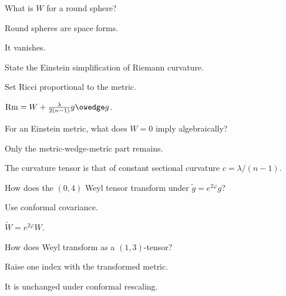 \begin{exercise}\label{exr:vii28-12}
What is \(W\) for a round sphere?
\end{exercise}
\begin{hint}
Round spheres are space forms.
\end{hint}
\begin{solution}
It vanishes.
\end{solution}

\begin{exercise}\label{exr:vii28-13}
State the Einstein simplification of Riemann curvature.
\end{exercise}
\begin{hint}
Set Ricci proportional to the metric.
\end{hint}
\begin{solution}
\(\operatorname{Rm}=W+\frac{\lambda}{2(n-1)}g\owedge g\).
\end{solution}

\begin{exercise}\label{exr:vii28-14}
For an Einstein metric, what does \(W=0\) imply algebraically?
\end{exercise}
\begin{hint}
Only the metric-wedge-metric part remains.
\end{hint}
\begin{solution}
The curvature tensor is that of constant sectional curvature \(c=\lambda/(n-1)\).
\end{solution}

\begin{exercise}\label{exr:vii28-15}
How does the \((0,4)\) Weyl tensor transform under \(\widetilde g=e^{2\varphi}g\)?
\end{exercise}
\begin{hint}
Use conformal covariance.
\end{hint}
\begin{solution}
\(\widetilde W=e^{2\varphi}W\).
\end{solution}

\begin{exercise}\label{exr:vii28-16}
How does Weyl transform as a \((1,3)\)-tensor?
\end{exercise}
\begin{hint}
Raise one index with the transformed metric.
\end{hint}
\begin{solution}
It is unchanged under conformal rescaling.
\end{solution}

